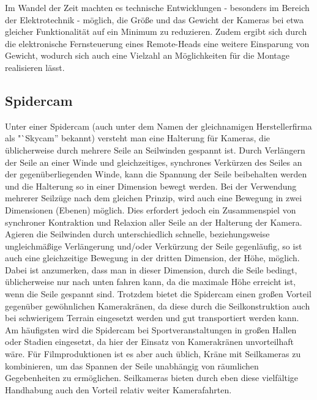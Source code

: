 \documentclass[a4paper, 12pt, bibliography=totocnumbered, listof=numbered]{scrartcl}
\begin{document}
	Im Wandel der Zeit machten es technische Entwicklungen - besonders im Bereich der Elektrotechnik - möglich, die Größe und das Gewicht der Kameras bei etwa gleicher Funktionalität auf ein Minimum zu reduzieren. Zudem ergibt sich durch die elektronische Fernsteuerung eines Remote-Heads eine weitere Einsparung von Gewicht, wodurch sich auch eine Vielzahl an Möglichkeiten für die Montage realisieren lässt.

	\subsection{Spidercam}
	Unter einer Spidercam (auch unter dem Namen der gleichnamigen Herstellerfirma als "`Skycam” bekannt) versteht man eine Halterung für Kameras, die üblicherweise durch mehrere Seile an Seilwinden gespannt ist. Durch Verlängern der Seile an einer Winde und gleichzeitiges, synchrones Verkürzen des Seiles an der gegenüberliegenden Winde, kann die Spannung der Seile beibehalten werden und die Halterung so in einer Dimension bewegt werden. Bei der Verwendung mehrerer Seilzüge nach dem gleichen Prinzip, wird auch eine Bewegung in zwei Dimensionen (Ebenen) möglich. Dies erfordert jedoch ein Zusammenspiel von synchroner Kontraktion und Relaxion aller Seile an der Halterung der Kamera. Agieren die Seilwinden durch unterschiedlich schnelle, beziehungsweise ungleichmäßige Verlängerung und/oder Verkürzung der Seile gegenläufig, so ist auch eine gleichzeitige Bewegung in der dritten Dimension, der Höhe, möglich. Dabei ist anzumerken, dass man in dieser Dimension, durch die Seile bedingt, üblicherweise nur nach unten fahren kann, da die maximale Höhe erreicht ist, wenn die Seile gespannt sind. Trotzdem bietet die Spidercam einen großen Vorteil gegenüber gewöhnlichen Kamerakränen, da diese durch die Seilkonstruktion auch bei schwierigem Terrain eingesetzt werden und gut transportiert werden kann. Am häufigsten wird die Spidercam bei Sportveranstaltungen in großen Hallen oder Stadien eingesetzt, da hier der Einsatz von Kamerakränen unvorteilhaft wäre. Für Filmproduktionen ist es aber auch üblich, Kräne mit Seilkameras zu kombinieren, um das Spannen der Seile unabhängig von räumlichen Gegebenheiten zu ermöglichen. Seilkameras bieten durch eben diese vielfältige Handhabung auch den Vorteil relativ weiter Kamerafahrten.
	
\end{document}
